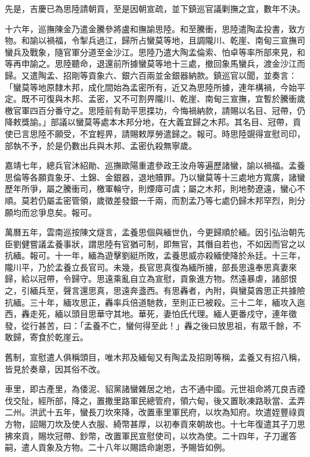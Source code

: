 \begin{pinyinscope}
先是，吉慶已為思陸請朝貢，至是因朝宣疏，並下鎮巡官議剿撫之宜，數年不決。

十六年，巡撫陳金乃遣金騰參將盧和撫諭思陸。和至騰衝，思陸遣陶孟投書，致方物。和諭以禍福，令掣兵過江，歸所占蠻莫等地，且調隴川、乾崖、南甸三宣撫司蠻兵及戰象，隨官軍分道至金沙江。思陸乃遣大陶孟倫索、怕卓等率所部來見，和等再申諭之。思陸聽命，退還前所據蠻莫等地十三處，撤回象馬蠻兵，渡金沙江而歸。又遣陶孟、招剛等貢象六、銀六百兩並金銀器納款。鎮巡官以聞，並奏言：「蠻莫等地原隸木邦，成化間始為孟密所有，近又為思陸所據，連年構禍，今始平定。既不可復與木邦、孟密，又不可割畀隴川、乾崖、南甸三宣撫，宜暫於騰衝歲檄官軍四百分番守之。思陸前有助平思揲功，今悔禍納款，請賜以名目、冠帶，仍降敕獎諭。」部議以蠻莫等處本木邦分地，在大義宜歸之木邦。其名目、冠帶，貢使已言思陸不願受，不宜輕畀，請賜敕厚勞遣歸之。報可。時思陸覬得宣慰司印，部執不予，於是仍數出兵與木邦、孟密仇殺無寧歲。

嘉靖七年，總兵官沐紹勛、巡撫歐陽重遣參政王汝舟等遍歷諸蠻，諭以禍福。孟養思倫等各願貢象牙、土錦、金銀器，退地贖罪。乃以蠻莫等十三處地方寬廣，諸蠻歷年所爭，屬之騰衝司，檄軍輪守，則煙瘴可虞；屬之木邦，則地勢遼遠，蠻心不順。莫若仍屬孟密管領，歲徵差發銀一千兩，而割孟乃等七處仍歸木邦罕烈，則分願均而忿爭息矣。報可。

萬曆五年，雲南巡按陳文燧言，孟養思個與緬世仇，今更歸順於緬。因引弘治朝先臣劉健嘗議孟養事狀，謂思陸有官猶可制，即無官，其僭自若也，不如因而官之以抗緬。報可。十一年，緬為遊擊劉綎所敗，孟養思威亦殺緬使降於糸廷。十三年，隴川平，乃於孟養立長官司。未幾，長官思真復為緬所擄，部長思遠奉思真妻來歸，給以冠帶，令歸守。思遠乘亂自立為宣慰，貢象進方物。然遠暴虐，諸部恨之，引緬兵至，聲言還思真，思遠奔盞西。有思轟者，內附，與蠻莫酋思正共據險抗緬。三十年，緬攻思正，轟率兵倍道馳救，至則正已被殺。三十二年，緬攻入迤西，轟走死，緬以頭目思華守其地。華死，妻怕氏代理。緬人更番戍守，連年徵發，從行甚苦，曰：「孟養不亡，蠻何得至此！」轟之後曰放思祖，有眾千餘，不敢歸，寄食於乾崖云。

舊制，宣慰遣人俱稱頭目，唯木邦及緬甸又有陶孟及招剛等稱，孟養又有招八稱，皆見於奏章，因其俗不改。

車里，即古產里，為倭泥、貂黨諸蠻雜居之地，古不通中國。元世祖命將兀良吉禋伐交阯，經所部，降之，置撒里路軍民總管府，領六甸，後又置耿凍路耿當、孟弄二州。洪武十五年，蠻長刀坎來降，改置車里軍民府，以坎為知府。坎遣姪豐祿貢方物，詔賜刀坎及使人衣服、綺幣甚厚，以初奉貢來朝故也。十七年復遣其子刀思拂來貢，賜坎冠帶、鈔幣，改置軍民宣慰使司，以坎為使。二十四年，子刀暹答嗣，遣人貢象及方物。二十八年以賜誥命謝恩，予賜皆如例。


\end{pinyinscope}
